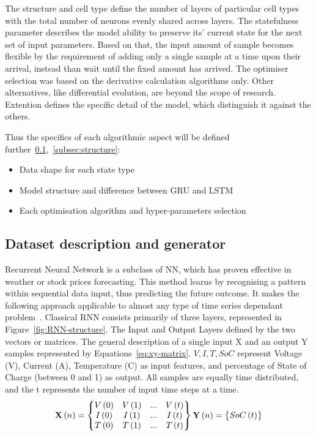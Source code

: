 %
%
The structure and cell type define the number of layers of particular cell types with the total number of neurons evenly shared across layers.
The statefulness parameter describes the model ability to preserve its' current state for the next set of input parameters.
Based on that, the input amount of sample becomes flexible by the requirement of adding only a single sample at a time upon their arrival, instead than wait until the fixed amount has arrived.
The optimiser selection was based on the derivative calculation algorithms only.
Other alternatives, like differential evolution, are beyond the scope of research.
Extention defines the specific detail of the model, which distinguish it against the others.

%
%
Thus the specifics of each algorithmic aspect will be defined further~\ref{subsec:dataset},~\ref{subsec:structure}:
\begin{itemize}
    \item Data shape for each state type
    \item Model structure and difference between GRU and LSTM
    \item Each optimisation algorithm and hyper-parameters selection
\end{itemize}

%
%
\subsection{Dataset description and generator} \label{subsec:dataset}
Recurrent Neural Network is a subclass of NN, which has proven effective in weather or stock prices forecasting.
This method learns by recognising a pattern within sequential data input, thus predicting the future outcome.
It makes the following approach applicable to almost any type of time series dependant problem~\cite{anton_battery_2013}.
Classical RNN consists primarily of three layers, represented in Figure~\ref{fig:RNN-structure}.
The Input and Output Layers defined by the two vectors or matrices.
The general description of a single input X and an output Y samples represented by Equations~\ref{eq:xy-matrix}.
$V, I, T, SoC$ represent Voltage (V), Current (A), Temperature (\textdegree{}C) as input features, and percentage of State of Charge (between 0 and 1) as output.
All samples are equally time distributed, and the t represents the number of input time steps at a time.
\begin{equation}
    \textbf{X} \left (n  \right ) = 
    \begin{Bmatrix}
        V \left (0  \right ) & V \left (1  \right ) & ... & V \left (t  \right )\\ 
        I \left (0  \right ) & I \left (1  \right ) & ... & I \left (t  \right )\\ 
        T \left (0  \right ) & T \left (1  \right ) & ... & T \left (t  \right )\\
    \end{Bmatrix}
    \\ \textbf{Y} \left (n  \right ) = 
    \begin{Bmatrix}
        SoC \left (t  \right ) 
    \end{Bmatrix}
\label{eq:xy-matrix}
\end{equation}

